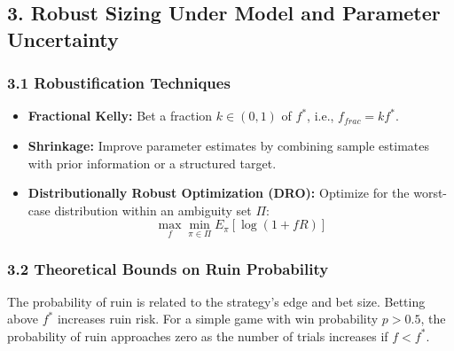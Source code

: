 \documentclass{article}
\begin{document}
\subsection*{3. Robust Sizing Under Model and Parameter Uncertainty}

\subsubsection*{3.1 Robustification Techniques}
\begin{itemize}
    \item \textbf{Fractional Kelly:}  Bet a fraction $k \in (0, 1)$ of $f^*$, i.e., $f_{frac} = k f^*$.
    \item \textbf{Shrinkage:} Improve parameter estimates by combining sample estimates with prior information or a structured target.
    \item \textbf{Distributionally Robust Optimization (DRO):} Optimize for the worst-case distribution within an ambiguity set $\Pi$:
    $$\max_f \min_{\pi \in \Pi} E_\pi[\log(1+fR)]$$
\end{itemize}

\subsubsection*{3.2 Theoretical Bounds on Ruin Probability}
The probability of ruin is related to the strategy's edge and bet size.  Betting above $f^*$ increases ruin risk.  For a simple game with win probability $p > 0.5$, the probability of ruin approaches zero as the number of trials increases if $f < f^*$.
\end{document}
